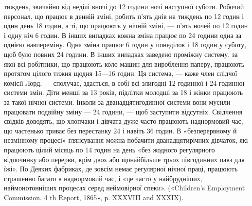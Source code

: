 тиждень, звичайно від неділі вночі до 12 години ночі наступної суботи.
Робочий персонал, що працює в денній зміні, робить п’ять днів на тиждень
по 12 годин і один день 18 годин, а ті, що працюють у нічній зміні, — п’ять
ночей по 12 годин і одну ніч 6 годин. В інших випадках кожна зміна працює
по 24 години одна за однією навпереміну. Одна зміна працює 6 годин у
понеділок і 18 годин у суботу, щоб було повних 24 години. В інших випадках
заведено проміжну систему, за якої всі робітники, що працюють
коло машин для вироблення паперу, працюють протягом цілого тижня
щодня 15—16 годин. Ця система, — каже член слідчої комісії Лорд, —
сполучає, здається, в собі всі злигодні 12-годинної і 24-годинної системи
змін. Діти менші за 13 років, підлітки молодші за 18 і жінки працюють
за такої нічної системи. Інколи за дванадцятигодинної системи вони
мусили працювати подвійну зміну — 24 години, — щоб заступити відсутніх.
Свідчення свідків доводять, що хлопчаки і дівчата дуже часто працюють
наднормовий час, що частенько триває без перестанку 24 і навіть 36 годин.
В «безперервному й незмінному процесі» ґлянсування можна побачити
дванадцятирічних дівчаток, які працюють цілий місяць по 14 годин на
день «без жодного регулярного відпочинку або перерви, крім двох або
щонайбільше трьох півгодинних павз для їжі». По Деяких фабриках, де
зовсім немає регулярної нічної праці, працюють страшенно багато в наднормовий
час, і «це часто у найбрудніших, наймонотонніших процесах
серед неймовірної спеки». («Children’s Employment Commission. 4 th
Report, 1865», p. XXXVIII and XXXIX).